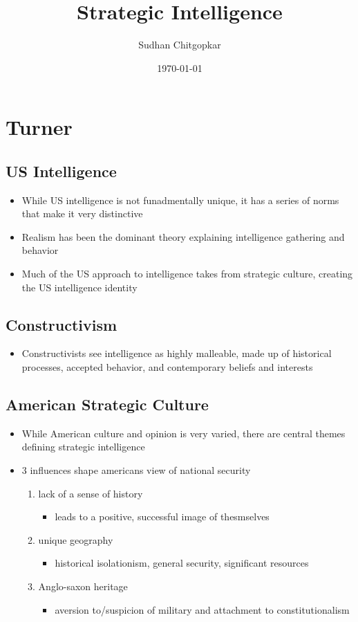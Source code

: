 \documentclass[11pt]{article}
\author{Sudhan Chitgopkar}
\date{\today}
\title{Strategic Intelligence}
\begin{document}
\maketitle
\tableofcontents \clearpage\section{Turner}
\label{sec:org8e20f53}
\subsection{US Intelligence}
\label{sec:org24ff352}
\begin{itemize}
\item While US intelligence is not funadmentally unique, it has a series of norms that make it very distinctive
\item Realism has been the dominant theory explaining intelligence gathering and behavior
\item Much of the US approach to intelligence takes from strategic culture, creating the US intelligence identity
\end{itemize}
\subsection{Constructivism}
\label{sec:org593228a}
\begin{itemize}
\item Constructivists see intelligence as highly malleable, made up of historical processes, accepted behavior, and contemporary beliefs and interests
\end{itemize}
\subsection{American Strategic Culture}
\label{sec:org9f6d405}
\begin{itemize}
\item While American culture and opinion is very varied, there are central themes defining strategic intelligence
\item 3 influences shape americans view of national security
\begin{enumerate}
\item lack of a sense of history
\begin{itemize}
\item leads to a positive, successful image of thesmselves
\end{itemize}
\item unique geography
\begin{itemize}
\item historical isolationism, general security, significant resources
\end{itemize}
\item Anglo-saxon heritage
\begin{itemize}
\item aversion to/suspicion of military and attachment to constitutionalism
\end{itemize}
\end{enumerate}
\end{itemize}
\end{document}
